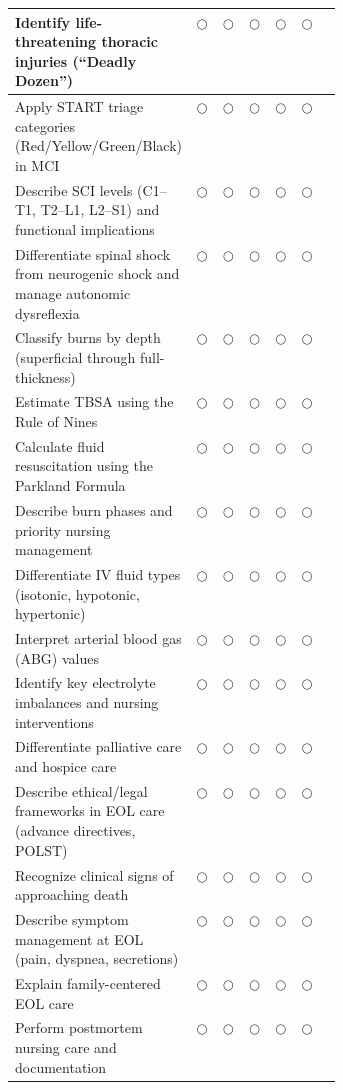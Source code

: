 \documentclass[11pt,letterpaper]{article}
\begin{document}
\begin{selfbox}
\begin{center}
\begin{longtable}{|p{0.38\linewidth}|c|c|c|c|c|c|}
\hline
Identify life-threatening thoracic injuries (``Deadly Dozen'') & $\bigcirc$ & $\bigcirc$ & $\bigcirc$ & $\bigcirc$ & $\bigcirc$ & \\
\hline
Apply START triage categories (Red/Yellow/Green/Black) in MCI & $\bigcirc$ & $\bigcirc$ & $\bigcirc$ & $\bigcirc$ & $\bigcirc$ & \\
\hline
Describe SCI levels (C1--T1, T2--L1, L2--S1) and functional implications & $\bigcirc$ & $\bigcirc$ & $\bigcirc$ & $\bigcirc$ & $\bigcirc$ & \\
\hline
Differentiate spinal shock from neurogenic shock and manage autonomic dysreflexia & $\bigcirc$ & $\bigcirc$ & $\bigcirc$ & $\bigcirc$ & $\bigcirc$ & \\
\hline
Classify burns by depth (superficial through full-thickness) & $\bigcirc$ & $\bigcirc$ & $\bigcirc$ & $\bigcirc$ & $\bigcirc$ & \\
\hline
Estimate TBSA using the Rule of Nines & $\bigcirc$ & $\bigcirc$ & $\bigcirc$ & $\bigcirc$ & $\bigcirc$ & \\
\hline
Calculate fluid resuscitation using the Parkland Formula & $\bigcirc$ & $\bigcirc$ & $\bigcirc$ & $\bigcirc$ & $\bigcirc$ & \\
\hline
Describe burn phases and priority nursing management & $\bigcirc$ & $\bigcirc$ & $\bigcirc$ & $\bigcirc$ & $\bigcirc$ & \\
\hline
Differentiate IV fluid types (isotonic, hypotonic, hypertonic) & $\bigcirc$ & $\bigcirc$ & $\bigcirc$ & $\bigcirc$ & $\bigcirc$ & \\
\hline
Interpret arterial blood gas (ABG) values & $\bigcirc$ & $\bigcirc$ & $\bigcirc$ & $\bigcirc$ & $\bigcirc$ & \\
\hline
Identify key electrolyte imbalances and nursing interventions & $\bigcirc$ & $\bigcirc$ & $\bigcirc$ & $\bigcirc$ & $\bigcirc$ & \\
\hline
Differentiate palliative care and hospice care & $\bigcirc$ & $\bigcirc$ & $\bigcirc$ & $\bigcirc$ & $\bigcirc$ & \\
\hline
Describe ethical/legal frameworks in EOL care (advance directives, POLST) & $\bigcirc$ & $\bigcirc$ & $\bigcirc$ & $\bigcirc$ & $\bigcirc$ & \\
\hline
Recognize clinical signs of approaching death & $\bigcirc$ & $\bigcirc$ & $\bigcirc$ & $\bigcirc$ & $\bigcirc$ & \\
\hline
Describe symptom management at EOL (pain, dyspnea, secretions) & $\bigcirc$ & $\bigcirc$ & $\bigcirc$ & $\bigcirc$ & $\bigcirc$ & \\
\hline
Explain family-centered EOL care & $\bigcirc$ & $\bigcirc$ & $\bigcirc$ & $\bigcirc$ & $\bigcirc$ & \\
\hline
Perform postmortem nursing care and documentation & $\bigcirc$ & $\bigcirc$ & $\bigcirc$ & $\bigcirc$ & $\bigcirc$ & \\
\hline
\end{longtable}
\end{center}


\end{selfbox}
\end{document}
